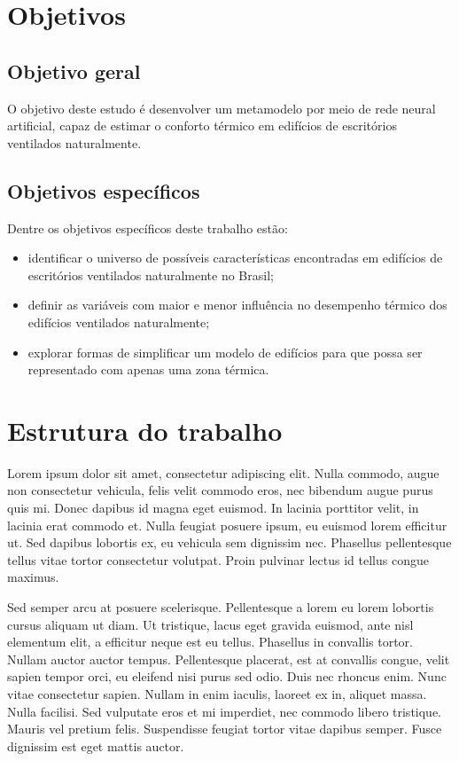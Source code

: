 \documentclass[brazil,hardcopy,openany,a5paper]{ufscthesis}
\begin{document}
\section{Objetivos}
\subsection{Objetivo geral}

O objetivo deste estudo é desenvolver um metamodelo por meio de rede neural artificial, capaz de estimar o conforto térmico em edifícios de escritórios ventilados naturalmente.

\subsection{Objetivos específicos}

Dentre os objetivos específicos deste trabalho estão:

\begin{itemize}
	\item identificar o universo de possíveis características encontradas em edifícios de escritórios ventilados naturalmente no Brasil;
	\item definir as variáveis com maior e menor influência no desempenho térmico dos edifícios ventilados naturalmente;
	\item explorar formas de simplificar um modelo de edifícios para que possa ser representado com apenas uma zona térmica.
\end{itemize}
	
	\section{Estrutura do trabalho}
	
	Lorem ipsum dolor sit amet, consectetur adipiscing elit. Nulla commodo, augue non consectetur vehicula, felis velit commodo eros, nec bibendum augue purus quis mi. Donec dapibus id magna eget euismod. In lacinia porttitor velit, in lacinia erat commodo et. Nulla feugiat posuere ipsum, eu euismod lorem efficitur ut. Sed dapibus lobortis ex, eu vehicula sem dignissim nec. Phasellus pellentesque tellus vitae tortor consectetur volutpat. Proin pulvinar lectus id tellus congue maximus.

	Sed semper arcu at posuere scelerisque. Pellentesque a lorem eu lorem lobortis cursus aliquam ut diam. Ut tristique, lacus eget gravida euismod, ante nisl elementum elit, a efficitur neque est eu tellus. Phasellus in convallis tortor. Nullam auctor auctor tempus. Pellentesque placerat, est at convallis congue, velit sapien tempor orci, eu eleifend nisi purus sed odio. Duis nec rhoncus enim. Nunc vitae consectetur sapien. Nullam in enim iaculis, laoreet ex in, aliquet massa. Nulla facilisi. Sed vulputate eros et mi imperdiet, nec commodo libero tristique. Mauris vel pretium felis. Suspendisse feugiat tortor vitae dapibus semper. Fusce dignissim est eget mattis auctor.
\end{document}
